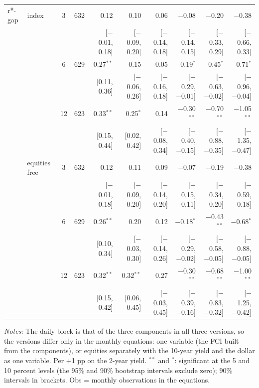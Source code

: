 \begin{longtable}{llcrrrrrrr}
\addlinespace
r*-gap & index & 3 & 632 & 0.12 & 0.10 & 0.06 & $-$0.08 & $-$0.20 & $-$0.38\\
 & & & & {\scriptsize [$-$0.01, 0.18]} & {\scriptsize [$-$0.09, 0.20]} & {\scriptsize [$-$0.14, 0.18]} & {\scriptsize [$-$0.14, 0.15]} & {\scriptsize [$-$0.33, 0.29]} & {\scriptsize [$-$0.66, 0.33]}\\
 &  & 6 & 629 & 0.27$^{**}$ & 0.15 & 0.05 & $-$0.19$^{*}$ & $-$0.45$^{*}$ & $-$0.71$^{*}$\\
 & & & & {\scriptsize [0.11, 0.36]} & {\scriptsize [$-$0.06, 0.26]} & {\scriptsize [$-$0.16, 0.18]} & {\scriptsize [$-$0.29, $-$0.01]} & {\scriptsize [$-$0.63, $-$0.02]} & {\scriptsize [$-$0.96, $-$0.04]}\\
 &  & 12 & 623 & 0.33$^{**}$ & 0.25$^{*}$ & 0.14 & $-$0.30$^{**}$ & $-$0.70$^{**}$ & $-$1.05$^{**}$\\
 & & & & {\scriptsize [0.15, 0.44]} & {\scriptsize [0.02, 0.42]} & {\scriptsize [$-$0.08, 0.34]} & {\scriptsize [$-$0.40, $-$0.15]} & {\scriptsize [$-$0.88, $-$0.35]} & {\scriptsize [$-$1.35, $-$0.47]}\\
 & equities free & 3 & 632 & 0.12 & 0.11 & 0.09 & $-$0.07 & $-$0.19 & $-$0.38\\
 & & & & {\scriptsize [$-$0.01, 0.18]} & {\scriptsize [$-$0.09, 0.20]} & {\scriptsize [$-$0.14, 0.20]} & {\scriptsize [$-$0.15, 0.11]} & {\scriptsize [$-$0.34, 0.20]} & {\scriptsize [$-$0.59, 0.18]}\\
 &  & 6 & 629 & 0.26$^{**}$ & 0.20 & 0.12 & $-$0.18$^{*}$ & $-$0.43$^{**}$ & $-$0.68$^{*}$\\
 & & & & {\scriptsize [0.10, 0.34]} & {\scriptsize [$-$0.03, 0.30]} & {\scriptsize [$-$0.14, 0.26]} & {\scriptsize [$-$0.29, $-$0.02]} & {\scriptsize [$-$0.58, $-$0.05]} & {\scriptsize [$-$0.88, $-$0.05]}\\
 &  & 12 & 623 & 0.32$^{**}$ & 0.32$^{**}$ & 0.27 & $-$0.30$^{**}$ & $-$0.68$^{**}$ & $-$1.00$^{**}$\\
 & & & & {\scriptsize [0.15, 0.42]} & {\scriptsize [0.06, 0.45]} & {\scriptsize [$-$0.03, 0.45]} & {\scriptsize [$-$0.39, $-$0.16]} & {\scriptsize [$-$0.83, $-$0.32]} & {\scriptsize [$-$1.25, $-$0.42]}\\
\end{longtable}
\begin{flushleft}\footnotesize\textit{Notes:} The daily block is that of the three components in all three versions, so the versions differ only in the monthly equations: one variable (the FCI built from the components), or equities separately with the 10-year yield and the dollar as one variable. Per +1 pp on the 2-year yield. $^{**}$ and $^{*}$: significant at the 5 and 10 percent levels (the 95\% and 90\% bootstrap intervals exclude zero); 90\% intervals in brackets. Obs = monthly observations in the equations.\end{flushleft}
\endgroup
